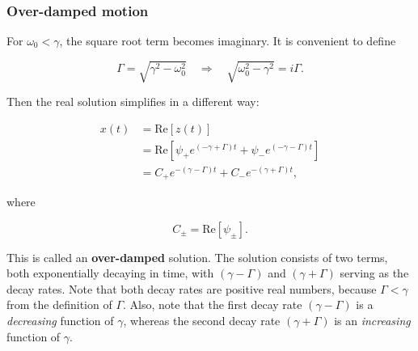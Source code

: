 \documentclass[11pt]{article}
\begin{document}
    \begin{center}
    \end{center}
    { \hspace*{\fill} \\}
    
    \subsubsection{Over-damped motion}\label{over-damped-motion}

For \(\omega_0 < \gamma\), the square root term becomes imaginary. It is
convenient to define

\[\Gamma = \sqrt{\gamma^2 - \omega_0^2} \quad \Rightarrow \quad \sqrt{\omega_0^2 - \gamma^2} = i \Gamma.\]

Then the real solution simplifies in a different way:

\[\begin{align} x(t) &= \mathrm{Re}\left[z(t)\right] \\&= \mathrm{Re}\left[\psi_+ e^{\left(-\gamma  + \Gamma\right)t} + \psi_- e^{\left(-\gamma - \Gamma\right)t} \right] \\ &= C_+ e^{-(\gamma - \Gamma) t} + C_- e^{-(\gamma + \Gamma) t},\end{align}\]

where

\[C_\pm = \mathrm{Re}[\psi_\pm].\]

This is called an \textbf{over-damped} solution. The solution consists
of two terms, both exponentially decaying in time, with
\((\gamma-\Gamma)\) and \((\gamma + \Gamma)\) serving as the decay
rates. Note that both decay rates are positive real numbers, because
\(\Gamma < \gamma\) from the definition of \(\Gamma\). Also, note that
the first decay rate \((\gamma - \Gamma)\) is a \emph{decreasing}
function of \(\gamma\), whereas the second decay rate
\((\gamma + \Gamma)\) is an \emph{increasing} function of \(\gamma\).
\end{document}
